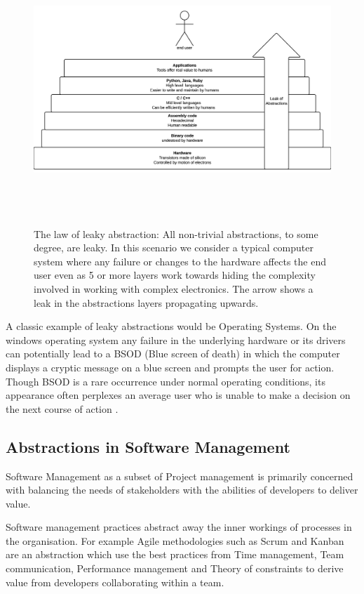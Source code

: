 \documentclass[12pt,conference]{IEEEtran}
\begin{document}
\begin{figure}
  \centering
  \includegraphics[height=4in]{leakyabstraction}
  \caption{The law of leaky abstraction: All non-trivial abstractions, to some degree, are leaky. In this scenario we consider a typical computer system where any failure or changes to the hardware affects the end user even as 5 or more layers work towards hiding the complexity involved in working with complex electronics. The arrow shows a leak in the abstractions layers propagating upwards.}
  \label{leakyabstraction}
\end{figure}

A classic example of leaky abstractions would be Operating Systems. On the windows operating system any failure in the underlying hardware or its drivers can potentially lead to a BSOD (Blue screen of death) in which the computer displays a cryptic message on a blue screen and prompts the user for action. Though BSOD is a rare occurrence under normal operating conditions, its appearance often perplexes an average user who is unable to make a decision on the next course of action \cite{rosenberg_law_2007}. 

\subsection*{Abstractions in Software Management}

Software Management as a subset of Project management is primarily concerned with balancing the needs of stakeholders with the abilities of developers to deliver value.

Software management practices abstract away the inner workings of processes in the organisation. For example Agile methodologies such as Scrum and Kanban are an abstraction which use the best practices from Time management, Team communication, Performance management and Theory of constraints to derive value from developers collaborating within a team. 
\end{document}
